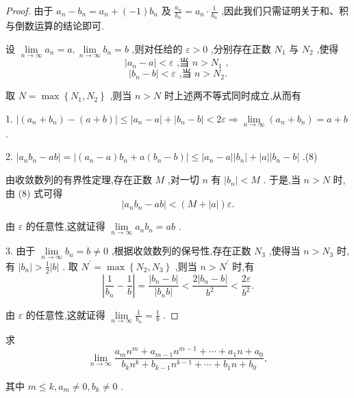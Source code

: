 \begin{proof}
由于 \({a}_{n} - {b}_{n} = {a}_{n} + \left( {-1}\right) {b}_{n}\) 及 \(\frac{{a}_{n}}{{b}_{n}} = {a}_{n} \cdot  \frac{1}{{b}_{n}}\) ,因此我们只需证明关于和、积与倒数运算的结论即可.

设 \(\mathop{\lim }\limits_{{n \rightarrow  \infty }}{a}_{n} = a,\mathop{\lim }\limits_{{n \rightarrow  \infty }}{b}_{n} = b\) ,则对任给的 \(\varepsilon  > 0\) ,分别存在正数 \({N}_{1}\) 与 \({N}_{2}\) ,使得
\[
\left| {{a}_{n} - a}\right|  < \varepsilon \text{ ,当 }n > {N}_{1}\text{ , }
\]
\[
\left| {{b}_{n} - b}\right|  < \varepsilon \text{ ,当 }n > {N}_{2}.
\]

取 \(N = \max \left\{  {{N}_{1},{N}_{2}}\right\}\) ,则当 \(n > N\) 时上述两不等式同时成立,从而有

1. \(\left| {\left( {{a}_{n} + {b}_{n}}\right)  - \left( {a + b}\right) }\right|  \leq  \left| {{a}_{n} - a}\right|  + \left| {{b}_{n} - b}\right|  < {2\varepsilon } \Rightarrow  \mathop{\lim }\limits_{{n \rightarrow  \infty }}\left( {{a}_{n} + {b}_{n}}\right)  = a + b\) .

2. \(\left| {{a}_{n}{b}_{n} - {ab}}\right|  = \left| {\left( {{a}_{n} - a}\right) {b}_{n} + a\left( {{b}_{n} - b}\right) }\right|  \leq  \left| {{a}_{n} - a}\right| \left| {b}_{n}\right|  + \left| a\right| \left| {{b}_{n} - b}\right|\) .(8)

由收敛数列的有界性定理,存在正数 \(M\) ,对一切 \(n\) 有 \(\left| {b}_{n}\right|  < M\) . 于是,当 \(n > N\) 时,由 (8) 式可得
\[
\left| {{a}_{n}{b}_{n} - {ab}}\right|  < \left( {M + \left| a\right| }\right) \varepsilon .
\]

由 \(\varepsilon\) 的任意性,这就证得 \(\mathop{\lim }\limits_{{n \rightarrow  \infty }}{a}_{n}{b}_{n} = {ab}\) .

3. 由于 \(\mathop{\lim }\limits_{{n \rightarrow  \infty }}{b}_{n} = b \neq  0\) ,根据收敛数列的保号性,存在正数 \({N}_{3}\) ,使得当 \(n > {N}_{3}\) 时,有 \(\left| {b}_{n}\right|  > \frac{1}{2}\left| b\right|\) . 取 \({N}^{\prime } = \max \left\{  {{N}_{2},{N}_{3}}\right\}\) ,则当 \(n > {N}^{\prime }\) 时,有
\[
\left| {\frac{1}{{b}_{n}} - \frac{1}{b}}\right|  = \frac{\left| {b}_{n} - b\right| }{\left| {b}_{n}b\right| } < \frac{2\left| {{b}_{n} - b}\right| }{{b}^{2}} < \frac{2\varepsilon }{{b}^{2}}.
\]

由 \(\varepsilon\) 的任意性,这就证得 \(\mathop{\lim }\limits_{{n \rightarrow  \infty }}\frac{1}{{b}_{n}} = \frac{1}{b}\) .
\end{proof}


\begin{example}
求
\[
\mathop{\lim }\limits_{{n \rightarrow  \infty }}\frac{{a}_{m}{n}^{m} + {a}_{m - 1}{n}^{m - 1} + \cdots  + {a}_{1}n + {a}_{0}}{{b}_{k}{n}^{k} + {b}_{k - 1}{n}^{k - 1} + \cdots  + {b}_{1}n + {b}_{0}},
\]

其中 \(m \leq  k,{a}_{m} \neq  0,{b}_{k} \neq  0\) .

\end{example}

